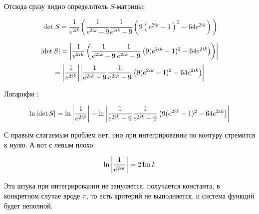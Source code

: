 Отсюда сразу видно определитель $S$-матрицы:

\[
\det S = \frac{1}{e^{2 i k}} \left( \frac{1}{e^{2 i k} - 9} \frac{1}{e^{2 i k} - 9} \left( 9 (e^{2 i k} - 1)^2 - 64 e^{2 i k} \right) \right)
\]

\[
\abs{\det S} = \abs{\frac{1}{e^{2 i k}} \left( \frac{1}{e^{2 i k} - 9} \frac{1}{e^{2 i k} - 9} \left( 9 (e^{2 i k} - 1)^2 - 64 e^{2 i k} \right) \right)} 
\]
\[
             = \abs{\frac{1}{e^{2 i k}}}  \abs{\frac{1}{e^{2 i k} - 9} \frac{1}{e^{2 i k} - 9} \left( 9 (e^{2 i k} - 1)^2 - 64 e^{2 i k} \right)} 
\]

Логарифм :

\[
\ln \abs{\det S} = \ln \abs{\frac{1}{e^{2 i k}}} + \ln  \abs{\frac{1}{e^{2 i k} - 9} \frac{1}{e^{2 i k} - 9} \left( 9 (e^{2 i k} - 1)^2 - 64 e^{2 i k} \right)} 
\]

С правым слагаемым проблем нет, оно при интегрировании по контуру стремится к нулю. А вот с левым плохо:

\[
\ln \abs{\frac{1}{e^{2 i k}}} = 2 \Im k
\]

Эта штука при интегрировании не зануляется, получается константа, в конкретном случае вроде $\pi$, то есть критерий не выполняется, и система функций будет неполной. 





















